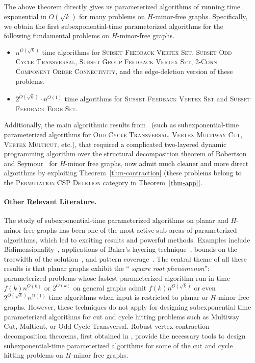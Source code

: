 \documentclass[a4paper,11pt]{article}
\numberwithin{lemma}{section}
\begin{document}
The above theorem directly gives us parameterized algorithms of running time exponential in $O(\sqrt{k})$ for many problems on $H$-minor-free graphs.
Specifically, we obtain the first subexponential-time parameterized algorithms for the following fundamental problems on $H$-minor-free graphs.
\begin{itemize}
 \item $n^{O(\sqrt{k})}$ time algorithms for \textsc{Subset Feedback Vertex Set}, \textsc{Subset Odd Cycle Transversal}, \textsc{Subset Group Feedback Vertex Set}, \textsc{2-Conn Component Order Connectivity}, and the edge-deletion version of these problems.
 \item $2^{\widetilde{O}(\sqrt{k})} \cdot n^{O(1)}$ time algorithms for \textsc{Subset Feedback Vertex Set} and \textsc{Subset Feedback Edge Set}.
\end{itemize}

Additionally, the main algorithmic results from~\cite{BandyapadhyayLLSJ22} (such as subexponential-time parameterized algorithms for \textsc{Odd Cycle Transversal}, \textsc{Vertex Multiway Cut}, \textsc{Vertex Multicut}, etc.),
that required a complicated two-layered dynamic programming algorithm over the structural decomposition theorem of Robertson and Seymour~\cite{RobertsonS03a} for $H$-minor free graphs,
now admit much cleaner and more direct algorithms by exploiting Theorem~\ref{thm-contraction} (these problems belong to the \textsc{Permutation CSP Deletion} category in Theorem~\ref{thm-app}).

\paragraph{Other Relevant Literature.}
The study of subexponential-time parameterized algorithms on planar and $H$-minor free graphs has been one of the most active sub-areas of parameterized algorithms, which led to exciting results and powerful methods.
Examples include Bidimensionality~\cite{DemaineFHT05}, applications of Baker's layering technique~\cite{BuiP92,DornFLRS13,Eppstein99,FominLMPPS16,Tazari12}, bounds on the treewidth of the solution~\cite{FominLKPS20,KleinM12,KleinM14,MarxPP18}, and pattern coverage~\cite{FominLMPPS16,Nederlof20a}.
The central theme of all these results is that planar graphs exhibit the ``\emph{ square root phenomenon}'': parameterized problems whose fastest parameterized algorithm run in time $f(k)n^{O(k)}$ or $2^{O(k)}$ on general graphs admit $f(k)n^{O(\sqrt{k})}$ or even $2^{O(\sqrt{k})}n^{O(1)}$ time algorithms when input is restricted to planar or $H$-minor free graphs.
However, these techniques do not apply for designing subexponential time parameterized algorithms for cut and cycle hitting problems such as {\sc Multiway Cut}, {\sc Multicut}, or {\sc Odd Cycle Transversal}.
Robust vertex contraction decomposition theorems, first obtained in \cite{BandyapadhyayLLSJ22,MarxMNT22}, provide the necessary tools to design subexponential-time parameterized algorithms for some of the cut and cycle hitting problems on $H$-minor free graphs.
\end{document}
